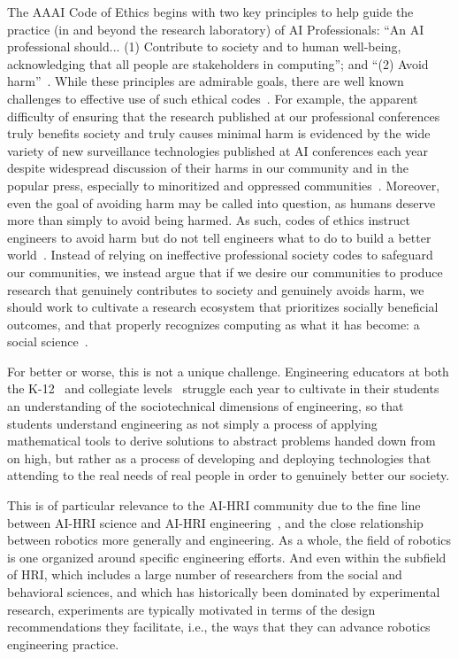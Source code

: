 \documentclass[letterpaper]{article} %
\begin{document}
The AAAI Code of Ethics begins with two key principles to help guide the practice (in and beyond the research laboratory) of AI Professionals: ``An AI professional should... (1) Contribute to society and to human well-being, acknowledging that all people are stakeholders in computing''; and ``(2) Avoid harm''~\cite{aaai2019aaai}. While these principles are admirable goals, there are well known challenges to effective use of such ethical codes~\cite{giorgini2015researcher}.
For example, the apparent difficulty of ensuring that the research published at our professional conferences truly benefits society and truly causes minimal harm is evidenced by the wide variety of new surveillance technologies published at AI conferences each year despite widespread discussion of their harms in our community and in the popular press, especially to minoritized and oppressed communities~\cite{gebru2020race}. Moreover, even the goal of avoiding harm may be called into question, as humans deserve more than simply to avoid being harmed. As such, codes of ethics instruct engineers to avoid harm but do not tell engineers what to do to build a better world~\cite{harris2008good}.
%
Instead of relying on ineffective professional society codes to safeguard our communities, we instead argue that if we desire our communities to produce research that genuinely contributes to society and genuinely avoids harm, we should work to cultivate a research ecosystem that prioritizes socially beneficial outcomes, and that properly recognizes computing as what it has become: a social science~\cite{connolly2020computing}.

For better or worse, this is not a unique challenge. Engineering educators at both the K-12~\cite{mcgowan2020engineering} and collegiate levels~\cite{swartz2019sociotechnical} struggle each year to cultivate in their students an understanding of the sociotechnical dimensions of engineering, so that students understand engineering as not simply a process of applying mathematical tools to derive solutions to abstract problems handed down from on high, but rather as a process of developing and deploying technologies that attending to the real needs of real people in order to genuinely better our society.

This is of particular relevance to the AI-HRI community due to the fine line between AI-HRI science and AI-HRI engineering~\cite{depalma2014quis}, and the
close relationship between robotics more generally and engineering. As a whole, the field of robotics is one organized around specific engineering efforts. And even within the subfield of HRI, which includes a large number of researchers from the social and behavioral sciences, and which has historically been dominated by experimental research, experiments are typically motivated in terms of the design recommendations they facilitate, i.e., the ways that they can advance robotics engineering practice.
\end{document}
